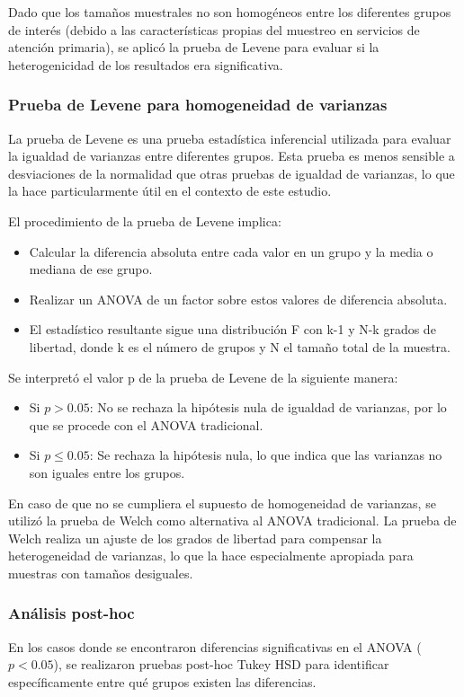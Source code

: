 \documentclass[11pt,letterpaper]{report}
\begin{document}
Dado que los tamaños muestrales no son homogéneos entre los diferentes grupos de
interés (debido a las características propias del muestreo en servicios de
atención primaria), se aplicó la prueba de Levene para evaluar si la
heterogenicidad de los resultados era significativa. 

\subsubsection{Prueba de Levene para homogeneidad de varianzas}
La prueba de Levene es una prueba estadística inferencial utilizada para
evaluar la igualdad de varianzas entre diferentes grupos. Esta prueba es menos
sensible a desviaciones de la normalidad que otras pruebas de igualdad de
varianzas, lo que la hace particularmente útil en el contexto de este estudio.

El procedimiento de la prueba de Levene implica:
\begin{itemize}
    \item Calcular la diferencia absoluta entre cada valor en un grupo y la
		media o mediana de ese grupo.
    \item Realizar un ANOVA de un factor sobre estos valores de diferencia
		absoluta.
    \item El estadístico resultante sigue una distribución F con k-1 y N-k
		grados de libertad, donde k es el número de grupos y N el tamaño total
		de la muestra.
\end{itemize}

Se interpretó el valor p de la prueba de Levene de la siguiente manera:
\begin{itemize}
    \item Si $p > 0.05$: No se rechaza la hipótesis nula de igualdad de
		varianzas, por lo que se procede con el ANOVA tradicional.
    \item Si $p \leq0.05$: Se rechaza la hipótesis nula, lo que indica que las
		varianzas no son iguales entre los grupos.
\end{itemize}

En caso de que no se cumpliera el supuesto de homogeneidad de varianzas, se
utilizó la prueba de Welch como alternativa al ANOVA tradicional. La prueba de
Welch realiza un ajuste de los grados de libertad para compensar la
heterogeneidad de varianzas, lo que la hace especialmente apropiada para
muestras con tamaños desiguales.

\subsubsection{Análisis post-hoc}
En los casos donde se encontraron diferencias significativas en el ANOVA
($p < 0.05$), se realizaron pruebas post-hoc Tukey HSD para identificar
específicamente entre qué grupos existen las diferencias.
\end{document}
